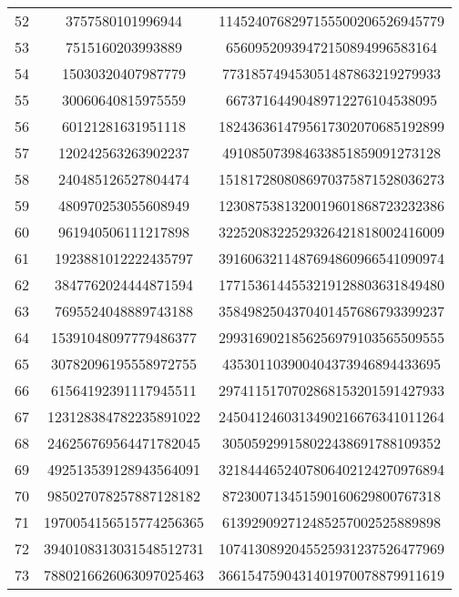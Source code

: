 \documentclass[fleqn]{article}
\begin{document}
\begin{center}
\begin{tabular}{c | c | c}
        \end{tabular}
        \newpage
        \begin{tabular}{c | c | c}
            52 & 3757580101996944 & 1145240768297155500206526945779 \\
            53 & 7515160203993889 & 65609520939472150894996583164 \\
            54 & 15030320407987779 & 773185749453051487863219279933 \\
            55 & 30060640815975559 & 66737164490489712276104538095 \\
            56 & 60121281631951118 & 1824363614795617302070685192899 \\
            57 & 120242563263902237 & 491085073984633851859091273128 \\
            58 & 240485126527804474 & 1518172808086970375871528036273 \\
            59 & 480970253055608949 & 1230875381320019601868723232386 \\
            60 & 961940506111217898 & 3225208322529326421818002416009 \\
            61 & 1923881012222435797 & 3916063211487694860966541090974 \\
            62 & 3847762024444871594 & 1771536144553219128803631849480 \\
            63 & 7695524048889743188 & 3584982504370401457686793399237 \\
            64 & 15391048097779486377 & 2993169021856256979103565509555 \\
            65 & 30782096195558972755 & 435301103900404373946894433695 \\
            66 & 61564192391117945511 & 2974115170702868153201591427933 \\
            67 & 123128384782235891022 & 2450412460313490216676341011264 \\
            68 & 246256769564471782045 & 305059299158022438691788109352 \\
            69 & 492513539128943564091 & 3218444652407806402124270976894 \\
            70 & 985027078257887128182 & 872300713451590160629800767318 \\
            71 & 1970054156515774256365 & 613929092712485257002525889898 \\
            72 & 3940108313031548512731 & 1074130892045525931237526477969 \\
            73 & 7880216626063097025463 & 3661547590431401970078879911619 \\

\end{tabular}
\end{center}
\end{document}
